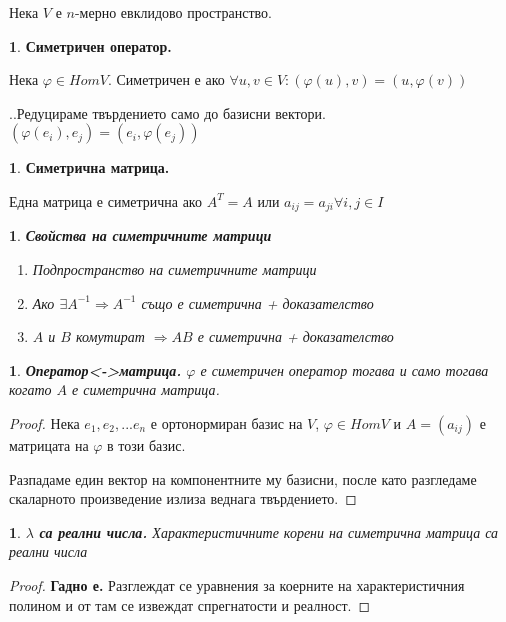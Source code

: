 \documentclass[11pt]{article}
\numberwithin{equation}{section}
\numberwithin{figure}{section}
\numberwithin{table}{section}
\theoremstyle{plain}
\theoremstyle{definition}
\newtheorem{defn}[thm]{\protect\definitionname}
\theoremstyle{remark}
\theoremstyle{definition}
\theoremstyle{remark}
\theoremstyle{plain}
\theoremstyle{definition}
\theoremstyle{definition}
\theoremstyle{plain}
\theoremstyle{plain}
\newtheorem{prop}[thm]{\protect\propositionname}
\theoremstyle{plain}
\theoremstyle{definition}
\theoremstyle{plain}
\providecommand{\definitionname}{Дефиниция}
\providecommand{\propositionname}{Твърдение}
\begin{document}
\hrulefill

Нека $V$ е $n$-мерно евклидово пространство.


\begin{defn}
\textbf{Симетричен оператор.}

Нека $\varphi \in HomV$. Симетричен е ако $\forall u,v \in V : (\varphi(u),v) = (u,\varphi(v))$
\end{defn}

..Редуцираме твърдението само до базисни вектори. $(\varphi(e_i),e_j) = (e_i,\varphi(e_j))$


\begin{defn}
\textbf{Симетрична матрица.}

Една матрица е симетрична ако $A^T = A$ или $a_{ij} = a_{ji} \forall i,j \in I$
\end{defn}

\begin{prop}
\textbf{Свойства на симетричните матрици}
\begin{enumerate}
\item Подпространство на симетричните матрици
\item Ако $\exists A^{-1} \Rightarrow A^{-1}$ също е симетрична + доказателство
\item $A$ и $B$ комутират $\Rightarrow AB$ е симетрична + доказателство
\end{enumerate}
\end{prop}


\begin{prop}
\textbf{Оператор<->матрица.}
$\varphi$ е симетричен оператор тогава и само тогава когато $A$ е симетрична матрица.
\end{prop}
\begin{proof}
Нека $e_1, e_2, ... e_n$ е ортонормиран базис на $V$, $\varphi \in HomV$ и $A = (a_{ij})$ е матрицата на $\varphi$ в този базис.

Разпадаме един вектор на компонентните му базисни, после като разгледаме скаларното произведение излиза веднага твърдението.
\end{proof}

\begin{prop}
\textbf{$\lambda$ са реални числа.}
Характеристичните корени на симетрична матрица са реални числа
\end{prop}
\begin{proof}
\textbf{Гадно е.}
Разглеждат се уравнения за коерните на характеристичния полином и от там се извеждат спрегнатости и реалност.
\end{proof}
\end{document}
